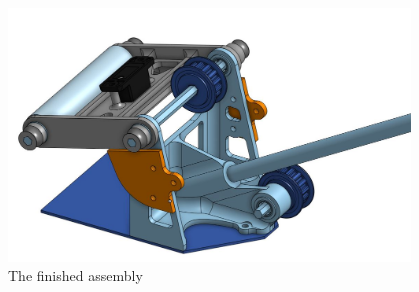 \begin{figure}[htp]
\centering
\includegraphics[width=0.95\textwidth, angle=0]{Meetings/November/11-22-21/11-22-21_CAD_Figure5 - Nathan Forrer.JPG}
\caption{The finished assembly}
\label{fig:112221_5}
\end{figure}



